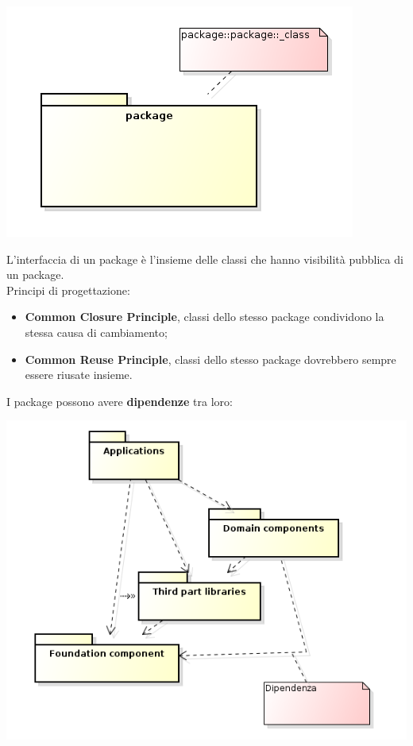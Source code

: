\begin{center}

\includegraphics[width=0.75\columnwidth]{img2} %

\end{center}

L'interfaccia di un package è l'insieme delle classi che hanno visibilità pubblica di un package.\\
Principi di progettazione:

\begin{itemize}

	\item \textbf{Common Closure Principle}, classi dello stesso package condividono la stessa causa di cambiamento;
	\item \textbf{Common Reuse Principle}, classi dello stesso package dovrebbero sempre essere riusate insieme.

\end{itemize}

I package possono avere \textbf{dipendenze} tra loro:

\begin{center}

\includegraphics[width=0.75\columnwidth]{img3} %

\end{center}

